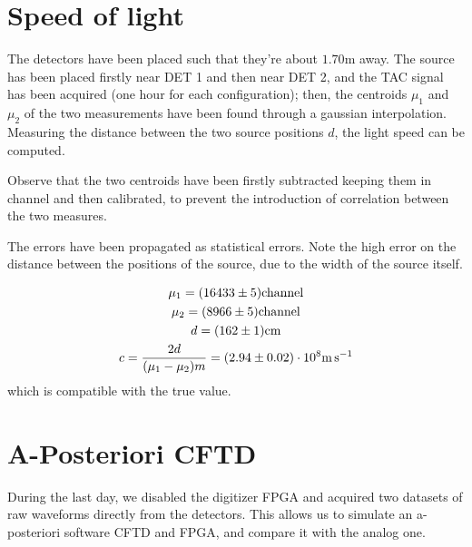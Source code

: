 \documentclass[11pt,a4 paper]{article}
\let\oldfrac\frac
\renewcommand{\frac}[3][d]{\ifthenelse{\equal{#1}{d}}{\oldfrac{#2}{#3}}{\nicefrac{#2}{#3}}}
\begin{document}
\section{Speed of light}
The detectors have been placed such that they're about $1.70\si{\metre}$ away. The  source has been placed firstly near DET 1 and then near DET 2, and the TAC signal has been acquired (one hour for each configuration); then, the centroids $\mu_1$ and $\mu_2$ of the two measurements have been found through a gaussian interpolation. Measuring the distance between the two source positions $d$, the light speed can be computed.

Observe that the two centroids have been firstly subtracted keeping them in channel and then calibrated, to prevent the introduction of correlation between the two measures.

The errors have been propagated as statistical errors. Note the high error on the distance between the positions of the source, due to the width of the source itself.

\begin{gather*}
    \mu_1 = (16433 \pm 5)\si{channel}\\
    \mu_2 = (8966 \pm 5)\si{channel} \\
    d = (162 \pm 1) \si{\centi\metre} \\
    c = \frac{2d}{(\mu_1-\mu_2)m} = (2.94 \pm 0.02 )\cdot 10^8 \si{\metre\per\second}
\end{gather*}
which is compatible with the true value.




\section{A-Posteriori CFTD}
During the last day, we disabled the digitizer FPGA and acquired two datasets of raw waveforms directly from the detectors. This allows us to simulate an a-posteriori software CFTD and FPGA, and compare it with the analog one.
\end{document}
